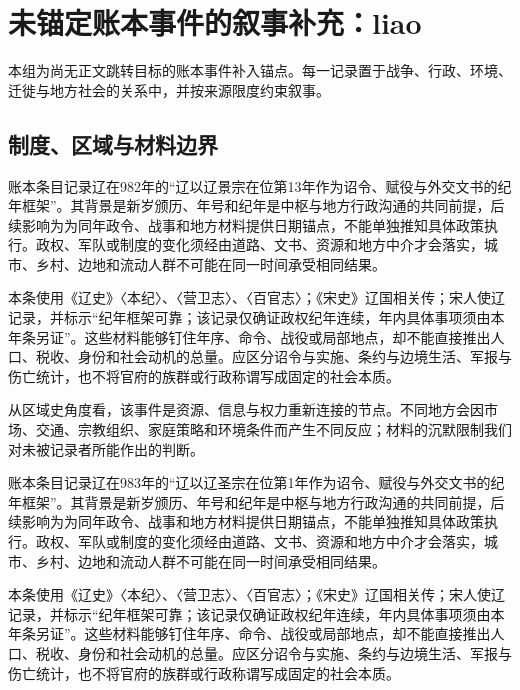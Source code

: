 \section{未锚定账本事件的叙事补充：liao}

\label{sec:anchor-batch-two-liao}

本组为尚无正文跳转目标的账本事件补入锚点。每一记录置于战争、行政、环境、迁徙与地方社会的关系中，并按来源限度约束叙事。

\subsection{制度、区域与材料边界}

账本条目记录辽在982年的“辽以辽景宗在位第13年作为诏令、赋役与外交文书的纪年框架”。其背景是新岁颁历、年号和纪年是中枢与地方行政沟通的共同前提，后续影响为为同年政令、战事和地方材料提供日期锚点，不能单独推知具体政策执行。政权、军队或制度的变化须经由道路、文书、资源和地方中介才会落实，城市、乡村、边地和流动人群不可能在同一时间承受相同结果。

本条使用《辽史》〈本纪〉、〈营卫志〉、〈百官志〉；《宋史》辽国相关传；宋人使辽记录，并标示“纪年框架可靠；该记录仅确证政权纪年连续，年内具体事项须由本年条另证”。这些材料能够钉住年序、命令、战役或局部地点，却不能直接推出人口、税收、身份和社会动机的总量。应区分诏令与实施、条约与边境生活、军报与伤亡统计，也不将官府的族群或行政称谓写成固定的社会本质。

从区域史角度看，该事件是资源、信息与权力重新连接的节点。不同地方会因市场、交通、宗教组织、家庭策略和环境条件而产生不同反应；材料的沉默限制我们对未被记录者所能作出的判断。

账本条目记录辽在983年的“辽以辽圣宗在位第1年作为诏令、赋役与外交文书的纪年框架”。其背景是新岁颁历、年号和纪年是中枢与地方行政沟通的共同前提，后续影响为为同年政令、战事和地方材料提供日期锚点，不能单独推知具体政策执行。政权、军队或制度的变化须经由道路、文书、资源和地方中介才会落实，城市、乡村、边地和流动人群不可能在同一时间承受相同结果。

本条使用《辽史》〈本纪〉、〈营卫志〉、〈百官志〉；《宋史》辽国相关传；宋人使辽记录，并标示“纪年框架可靠；该记录仅确证政权纪年连续，年内具体事项须由本年条另证”。这些材料能够钉住年序、命令、战役或局部地点，却不能直接推出人口、税收、身份和社会动机的总量。应区分诏令与实施、条约与边境生活、军报与伤亡统计，也不将官府的族群或行政称谓写成固定的社会本质。

